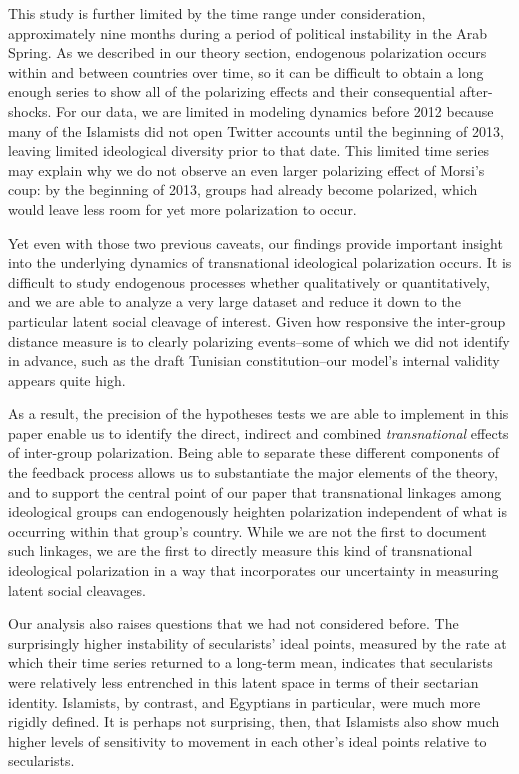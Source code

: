 \documentclass[12pt]{article}
\begin{document}
This study is further limited by the time range under consideration, approximately nine months during a period of political instability in the Arab Spring. As we described in our theory section, endogenous polarization occurs within and between countries over time, so it can be difficult to obtain a long enough series to show all of the polarizing effects and their consequential after-shocks. For our data, we are limited in modeling dynamics before 2012 because many of the Islamists did not open Twitter accounts until the beginning of 2013, leaving limited ideological diversity prior to that date. This limited time series may explain why we do not observe an even larger polarizing effect of Morsi's coup: by the beginning of 2013, groups had already become polarized, which would leave less room for yet more polarization to occur.

Yet even with those two previous caveats, our findings provide important insight into the underlying dynamics of transnational ideological polarization occurs. It is difficult to study endogenous processes whether qualitatively or quantitatively, and we are able to analyze a very large dataset and reduce it down to the particular latent social cleavage of interest. Given how responsive the inter-group distance measure is to clearly polarizing events--some of which we did not identify in advance, such as the draft Tunisian constitution--our model's internal validity appears quite high.

As a result, the precision of the hypotheses tests we are able to implement in this paper enable us to identify the direct, indirect and combined \emph{transnational} effects of inter-group polarization. Being able to separate these different components of the feedback process allows us to substantiate the major elements of the theory, and to support the central point of our paper that transnational linkages among ideological groups can endogenously heighten polarization independent of what is occurring within that group's country. While we are not the first to document such linkages, we are the first to directly measure this kind of transnational ideological polarization in a way that incorporates our uncertainty in measuring latent social cleavages.

Our analysis also raises questions that we had not considered before. The surprisingly higher instability of secularists' ideal points, measured by the rate at which their time series returned to a long-term mean, indicates that secularists were relatively less entrenched in this latent space in terms of their sectarian identity. Islamists, by contrast, and Egyptians in particular, were much more rigidly defined. It is perhaps not surprising, then, that Islamists also show much higher levels of sensitivity to movement in each other's ideal points relative to secularists.
\end{document}
